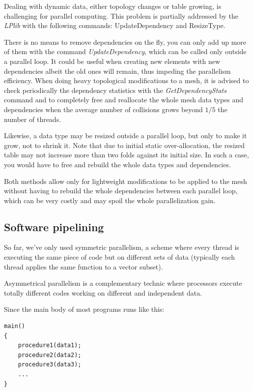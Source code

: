 \documentclass[a4paper,12pt]{article}
\begin{document}
Dealing with dynamic data, either topology changes or table growing, is challenging for parallel computing. This problem is partially addressed by the \emph{LPlib} with the following commands: UpdateDependency and ResizeType.

There is no means to remove dependencies on the fly, you can only add up more of them with the command \emph{UpdateDependency}, which can be called only outside a parallel loop. It could be useful when creating new elements with new dependencies albeit the old ones will remain, thus impeding the parallelism efficiency. When doing heavy topological modifications to a mesh, it is advised to check periodically the dependency statistics with the \emph{GetDependencyStats} command and to completely free and reallocate the whole mesh data types and dependencies when the average number of collisions grows beyond $1/5$ the number of threads.

Likewise, a data type may be resized outside a parallel loop, but only to make it grow, not to shrink it. Note that due to initial static over-allocation, the resized table may not increase more than two folds against its initial size. In such a case, you would have to free and rebuild the whole data types and dependencies.

Both methods allow only for lightweight modifications to be applied to the mesh without having to rebuild the whole dependencies between each parallel loop, which can be very costly and may spoil the whole parallelization gain.


\subsection{Software pipelining}

So far, we've only used symmetric parallelism, a scheme where every thread is executing the same piece of code but on different sets of data (typically each thread applies the same function to a vector subset).

Asymmetrical parallelism is a complementary technic where processors execute totally different codes working on different and independent data.

Since the main body of most programs runs like this:

\begin{tt}
\begin{verbatim}
main()
{
    procedure1(data1);
    procedure2(data2);
    procedure3(data3);
    ...
}
\end{verbatim}
\end{tt}
\normalfont
\end{document}
